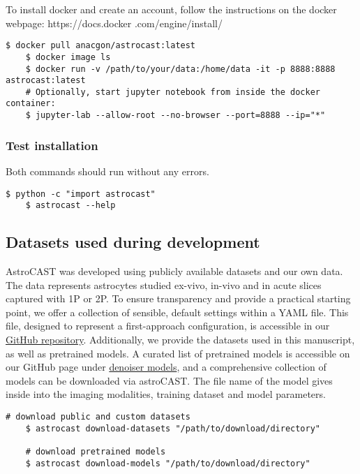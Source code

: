 To install docker and create an account, follow the instructions on the docker webpage: https://docs.docker
.com/engine/install/

\begin{lstlisting}[style=bashStyle]
    $ docker pull anacgon/astrocast:latest
    $ docker image ls
    $ docker run -v /path/to/your/data:/home/data -it -p 8888:8888 astrocast:latest
    # Optionally, start jupyter notebook from inside the docker container:
    $ jupyter-lab --allow-root --no-browser --port=8888 --ip="*"
\end{lstlisting}

\subsubsection{Test installation}

Both commands should run without any errors.

\begin{lstlisting}[style=bashStyle]
    $ python -c "import astrocast"
    $ astrocast --help
\end{lstlisting}

\subsection{Datasets used during development}
\label{ref:dataset-availability}

AstroCAST was developed using publicly available datasets and our own data. The data represents astrocytes studied ex-vivo, in-vivo and in acute slices captured with \ac{1P} or \ac{2P}. To ensure transparency and provide a practical starting point, we offer a collection of sensible, default settings within a YAML file. This file, designed to represent a first-approach configuration, is accessible in our \href{https://github.com/janreising/astroCAST}{GitHub repository}. Additionally, we provide the datasets used in this manuscript, as well as pretrained models. A curated list of pretrained models is accessible on our GitHub page under \href{https://github.com/janreising/astroCAST/tree/main/denoiser_models}{denoiser models}, and a comprehensive collection of models can be downloaded via astroCAST. The file name of the model gives inside into the imaging modalities, training dataset and model parameters.

\begin{lstlisting}[style=bashStyle]
    # download public and custom datasets
    $ astrocast download-datasets "/path/to/download/directory"

    # download pretrained models
    $ astrocast download-models "/path/to/download/directory"
\end{lstlisting}